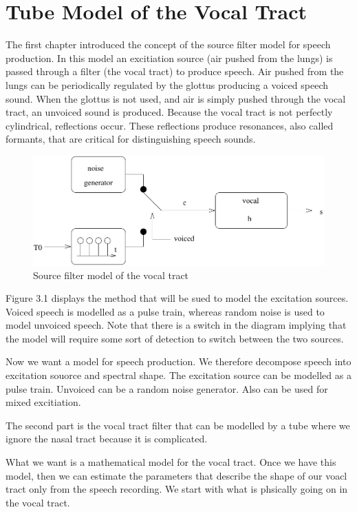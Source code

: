 
\section{Tube Model of the Vocal Tract}
\label{Tube Model of the Vocal Tract}


The first chapter introduced the concept of the source filter model for speech production. In this model an excitiation source (air pushed from the lungs) is passed through a filter (the vocal tract) to produce speech. Air pushed from the lungs can be periodically regulated by the glottus producing a voiced speech sound.  When the glottus is not used, and air is simply pushed through the vocal tract, an unvoiced sound is produced. Because the vocal tract is not perfectly cylindrical, reflections occur. These reflections produce resonances, also called formants, that are critical for distinguishing speech sounds. 

\begin{figure}[h]
	\centering
	 \def\svgwidth{10cm}
	\includegraphics[width=0.5\linewidth]{Pictures/Chapter3_Lesson3/filterVUv2-eps-converted-to.pdf}
	\caption{Source filter model of the vocal tract}
	\label{fig:SourceFil}
\end{figure}

Figure 3.1 displays the method that will be sued to model the excitation sources. Voiced speech is modelled as a pulse train, whereas random noise is used to model unvoiced speech.  Note that there is a switch in the diagram implying that the model will require some sort of detection to switch between the two sources. 

Now we want a model for speech production.  We therefore decompose speech into excitation souorce and spectral shape. The excitation source can be modelled as a pulse train. Unvoiced can be a random noise generator.  Also can be used for mixed excitiation. 

The second part is the vocal tract filter that can be modelled by a tube where we ignore the nasal tract because it is complicated.

What we want is a mathematical model for the vocal tract. Once we have this model, then we can estimate the parameters that describe the shape of our voacl tract only from the speech recording. We start with what is phsically going on in the vocal tract.

